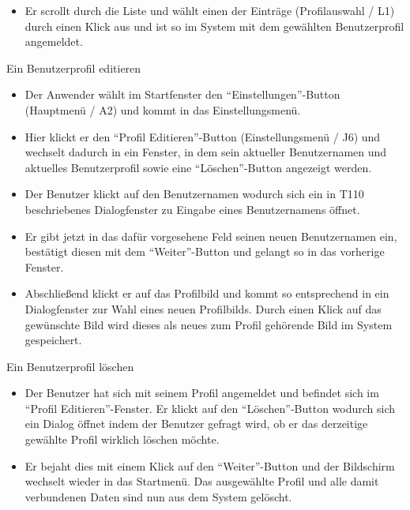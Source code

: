 \begin{requirements}
\begin{itemize}
  			\item Er scrollt durch die Liste und wählt einen der Einträge (Profilauswahl / L1) durch einen Klick aus und ist so im System mit dem gewählten Benutzerprofil angemeldet.
  			
	\end{itemize}
  	
  	
	
	 Ein Benutzerprofil editieren
	
	
	\begin{itemize}
  			\item Der Anwender wählt im Startfenster den "`Einstellungen"'-Button (Hauptmenü / A2) und kommt in das Einstellungsmenü.
  			
  			\item Hier klickt er den "`Profil Editieren"'-Button (Einstellungsmenü / J6) und wechselt dadurch in ein Fenster, in dem sein aktueller Benutzernamen und aktuelles Benutzerprofil sowie eine "`Löschen"'-Button angezeigt werden.
  			
  			\item Der Benutzer klickt auf den Benutzernamen wodurch sich ein in T110 beschriebenes Dialogfenster zu Eingabe eines Benutzernamens öffnet.
  			
  			\item Er gibt jetzt in das dafür vorgesehene Feld seinen neuen Benutzernamen ein, bestätigt diesen mit dem "`Weiter"'-Button und gelangt so in das vorherige Fenster.
  			
  			\item Abschließend klickt er auf das Profilbild und kommt so entsprechend in ein Dialogfenster zur Wahl eines neuen Profilbilds. Durch einen Klick auf das gewünschte Bild wird dieses als neues zum Profil gehörende Bild im System gespeichert.
  			
  			
  	\end{itemize}

  	
	
	
	 Ein Benutzerprofil löschen
	
	
	\begin{itemize}
  			\item Der Benutzer hat sich mit seinem Profil angemeldet und befindet sich im "`Profil Editieren"'-Fenster. Er klickt auf den "`Löschen"'-Button wodurch sich ein Dialog öffnet indem der Benutzer gefragt wird, ob er das derzeitige gewählte Profil wirklich löschen möchte.
  			
  			\item Er bejaht dies mit einem Klick auf den "`Weiter"'-Button und der Bildschirm wechselt wieder in das Startmenü. Das ausgewählte Profil und alle damit verbundenen Daten sind nun aus dem System gelöscht.
  			

\end{itemize}
\end{requirements}
